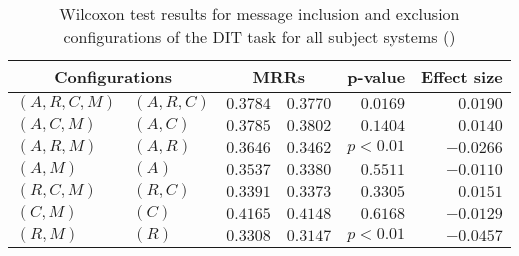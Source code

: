 
\begin{table}
\begin{spacing}{1.2}
\centering
\caption{Wilcoxon test results for message inclusion and exclusion configurations of the DIT task for all subject systems (\ctwo)}
\label{table:versus-wilcox-all-dit-message}
\begin{tabular}{ll|rr|rr}
\toprule
      \multicolumn{2}{c|}{Configurations} &                \multicolumn{2}{c|}{MRRs} &             p-value & Effect size \\
\midrule
 $(A,R,C,M)$ &  $(A,R,C)$ &  $\bm{0.3784}$ &       $0.3770$ & $0.0169$ &    $0.0190$ \\
   $(A,C,M)$ &    $(A,C)$ &       $0.3785$ &  $\bm{0.3802}$ & $0.1404$ &    $0.0140$ \\
   $(A,R,M)$ &    $(A,R)$ &  $\bm{0.3646}$ &       $0.3462$ & $p<0.01$ &   $-0.0266$ \\
     $(A,M)$ &      $(A)$ &  $\bm{0.3537}$ &       $0.3380$ & $0.5511$ &   $-0.0110$ \\
   $(R,C,M)$ &    $(R,C)$ &  $\bm{0.3391}$ &       $0.3373$ & $0.3305$ &    $0.0151$ \\
     $(C,M)$ &      $(C)$ &  $\bm{0.4165}$ &       $0.4148$ & $0.6168$ &   $-0.0129$ \\
     $(R,M)$ &      $(R)$ &  $\bm{0.3308}$ &       $0.3147$ & $p<0.01$ &   $-0.0457$ \\
\bottomrule
\end{tabular}

\end{spacing}
\end{table}

